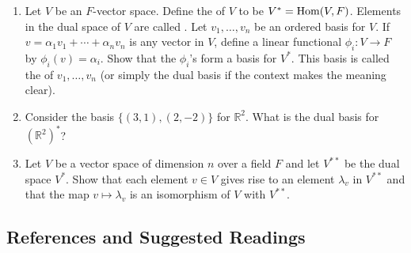 {\begin{enumerate}
\begin{enumerate}
   \item
Let $V$ be an $F$-vector space.  Define the  of $V$ 
to be $V^\ast = \operatorname{Hom}(V, F)$\label{notedual}. Elements in the dual space of $V$ are
called .  Let $v_1,
\ldots, v_n$ be an ordered basis for $V$. If $v = \alpha_1 v_1 +
\cdots + \alpha_n v_n$ is any vector in $V$, define a linear
functional  $\phi_i : V \rightarrow F$ by $\phi_i (v) = \alpha_i$.
Show that the $\phi_i$'s form a basis for $V^\ast$.  This basis is
called the  of $v_1, \ldots, v_n$ (or simply the dual
basis if the context makes the meaning clear).  
 

   \item
Consider the basis $\{ (3, 1), (2, -2) \}$ for ${\mathbb R}^2$. What is
the dual basis for $({\mathbb R}^2)^\ast$? 
 
   \item
Let $V$ be a vector space of dimension $n$ over a field $F$ and let
$V^{\ast \ast}$ be the dual space $V^\ast$.  Show that each element $v
\in V$ gives rise to an element $\lambda_v$ in $V^{\ast \ast}$ and
that the map $v \mapsto \lambda_v$ is an isomorphism of $V$ with
$V^{\ast \ast}$. 

\end{enumerate}
 

\end{enumerate}
}


 
\subsection*{References and Suggested Readings}  %
 

